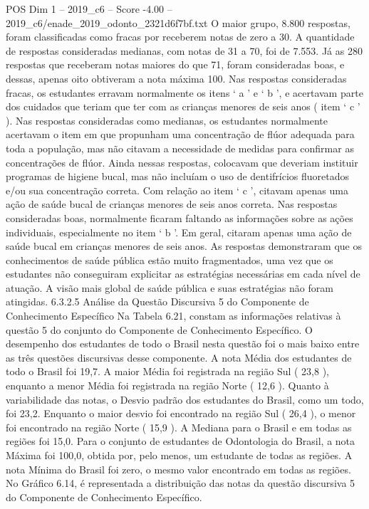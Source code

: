 \begin{textsample}{POS Dim 1 – 2019\_c6 – Score -4.00 – 2019\_c6/enade\_2019\_odonto\_2321d6f7bf.txt}
O maior grupo, 8.800 respostas, foram classificadas como fracas por receberem notas de zero a 30.
A quantidade de respostas consideradas medianas, com notas de 31 a 70, foi de 7.553.
Já as 280 respostas que receberam notas maiores do que 71, foram consideradas boas, e dessas, apenas oito obtiveram a nota máxima 100.
Nas respostas consideradas fracas, os estudantes erravam normalmente os itens ‘ a ’ e ‘ b ’, e acertavam parte dos cuidados que teriam que ter com as crianças menores de seis anos ( item ‘ c ’ ).
Nas respostas consideradas como medianas, os estudantes normalmente acertavam o item em que propunham uma concentração de flúor adequada para toda a população, mas não citavam a necessidade de medidas para confirmar as concentrações de flúor.
Ainda nessas respostas, colocavam que deveriam instituir programas de higiene bucal, mas não incluíam o uso de dentifrícios fluoretados e/ou sua concentração correta.
Com relação ao item ‘ c ’, citavam apenas uma ação de saúde bucal de crianças menores de seis anos correta.
Nas respostas consideradas boas, normalmente ficaram faltando as informações sobre as ações individuais, especialmente no item ‘ b ’.
Em geral, citaram apenas uma ação de saúde bucal em crianças menores de seis anos.
As respostas demonstraram que os conhecimentos de saúde pública estão muito fragmentados, uma vez que os estudantes não conseguiram explicitar as estratégias necessárias em cada nível de atuação.
A visão mais global de saúde pública e suas estratégias não foram atingidas. 6.3.2.5 Análise da Questão Discursiva 5 do Componente de Conhecimento Específico Na Tabela 6.21, constam as informações relativas à questão 5 do conjunto do Componente de Conhecimento Específico.
O desempenho dos estudantes de todo o Brasil nesta questão foi o mais baixo entre as três questões discursivas desse componente.
A nota Média dos estudantes de todo o Brasil foi 19,7.
A maior Média foi registrada na região Sul ( 23,8 ), enquanto a menor Média foi registrada na região Norte ( 12,6 ).
Quanto à variabilidade das notas, o Desvio padrão dos estudantes do Brasil, como um todo, foi 23,2.
Enquanto o maior desvio foi encontrado na região Sul ( 26,4 ), o menor foi encontrado na região Norte ( 15,9 ).
A Mediana para o Brasil e em todas as regiões foi 15,0.
Para o conjunto de estudantes de Odontologia do Brasil, a nota Máxima foi 100,0, obtida por, pelo menos, um estudante de todas as regiões.
A nota Mínima do Brasil foi zero, o mesmo valor encontrado em todas as regiões.
No Gráfico 6.14, é representada a distribuição das notas da questão discursiva 5 do Componente de Conhecimento Específico.

\end{textsample}
